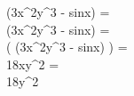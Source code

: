  (3x^2y^3 - sinx) =\\
 (3x^2y^3 - sinx) =\\

\left(
 (3x^2y^3 - sinx)
\right) =\\

 18xy^2 =\\
18y^2